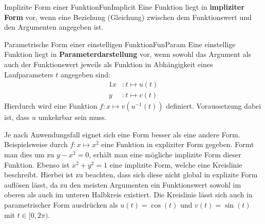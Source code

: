 \begin{definition}{Implizite Form einer Funktion}{FunImplicit}
    Eine Funktion liegt in \textbf{impliziter Form} vor, wenn eine Beziehung (Gleichung) zwischen dem Funktionswert und den Argumenten angegeben ist.
\end{definition}

\begin{definition}{Parametrische Form einer einstelligen Funktion}{FunParam}
    Eine einstellige Funktion liegt in \textbf{Parameterdarstellung} vor, wenn sowohl das Argument als auch der Funktionswert jeweils als Funktion in Abhängigkeit eines Laufparameters $t$ angegeben sind:
    \begin{alignat*}{1}
      x &: t \mapsto u(t) \\
      y &: t \mapsto v(t)
    \end{alignat*}
    Hierdurch wird eine Funktion $f: x \mapsto v(u^{-1}(t))$ definiert. Voraussetzung dabei ist, dass $u$ umkehrbar sein muss.
\end{definition}

Je nach Anwendungsfall eignet sich eine Form besser als eine andere Form. Beispielsweise durch $f: x \mapsto x^2$ eine Funktion in expliziter Form gegeben. Formt man dies um zu $y-x^2=0$, erhält man eine mögliche implizite Form dieser Funktion. Ebenso ist $x^2+y^2=1$ eine implizite Form, welche eine Kreislinie beschreibt. Hierbei ist zu beachten, dass sich diese nicht global in explizite Form auflösen lässt, da zu den meisten Argumenten ein Funktionswert sowohl im oberen als auch im unteren Halbkreis existiert. Die Kreislinie lässt sich auch in parametrischer Form ausdrücken als $u(t) = \cos(t)$ und $v(t) = \sin(t)$ mit $t\in[0,2\pi)$.

